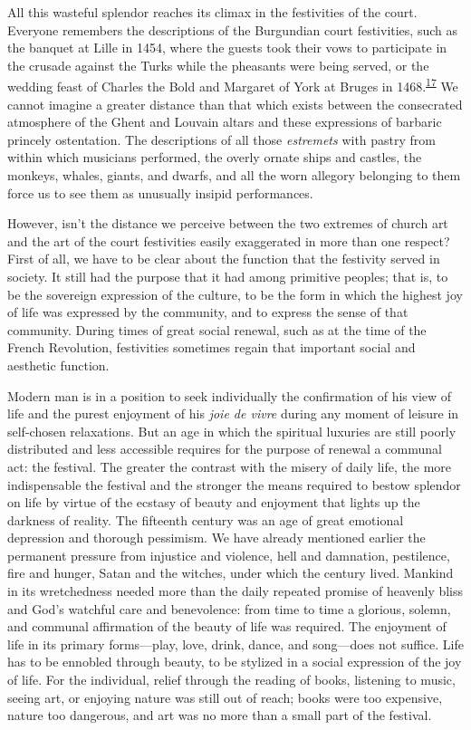 All this wasteful splendor reaches its climax in the festivities of the
court. Everyone remembers the descriptions of the Burgundian court
festivities, such as the banquet at Lille in 1454, where the guests took
their vows to participate in the crusade against the Turks while the
pheasants were being served, or the wedding feast of Charles the Bold
and Margaret of York at Bruges in
1468.\textsuperscript{\protect\hypertarget{20_ILLUSTRATIONS_FOLLOW_PAGE.xhtmlux5cux23id_439}{\protect\hyperlink{23_NOTES.xhtmlux5cux23id_440}{17}}}
We cannot imagine a greater distance than that which exists between the
consecrated atmosphere of the Ghent and Louvain altars and these
expressions of barbaric princely ostentation. The descriptions of all
those \emph{estremets} with pastry from within which musicians
performed, the overly ornate ships and castles, the monkeys, whales,
giants, and dwarfs, and all the worn allegory belonging to them force us
to see them as unusually insipid performances.

\protect\hypertarget{20_ILLUSTRATIONS_FOLLOW_PAGE.xhtmlux5cux23page_303}{}{}However,
isn't the distance we perceive between the two extremes of church art
and the art of the court festivities easily exaggerated in more than one
respect? First of all, we have to be clear about the function that the
festivity served in society. It still had the purpose that it had among
primitive peoples; that is, to be the sovereign expression of the
culture, to be the form in which the highest joy of life was expressed
by the community, and to express the sense of that community. During
times of great social renewal, such as at the time of the French
Revolution, festivities sometimes regain that important social and
aesthetic function.

Modern man is in a position to seek individually the confirmation of his
view of life and the purest enjoyment of his \emph{joie de vivre} during
any moment of leisure in self-chosen relaxations. But an age in which
the spiritual luxuries are still poorly distributed and less accessible
requires for the purpose of renewal a communal act: the festival. The
greater the contrast with the misery of daily life, the more
indispensable the festival and the stronger the means required to bestow
splendor on life by virtue of the ecstasy of beauty and enjoyment that
lights up the darkness of reality. The fifteenth century was an age of
great emotional depression and thorough pessimism. We have already
mentioned earlier the permanent pressure from injustice and violence,
hell and damnation, pestilence, fire and hunger, Satan and the witches,
under which the century lived. Mankind in its wretchedness needed more
than the daily repeated promise of heavenly bliss and God's watchful
care and benevolence: from time to time a glorious, solemn, and communal
affirmation of the beauty of life was required. The enjoyment of life in
its primary forms---play, love, drink, dance, and song---does not
suffice. Life has to be ennobled through beauty, to be stylized in a
social expression of the joy of life. For the individual, relief through
the reading of books, listening to music, seeing art, or enjoying nature
was still out of reach; books were too expensive, nature too dangerous,
and art was no more than a small part of the festival.

